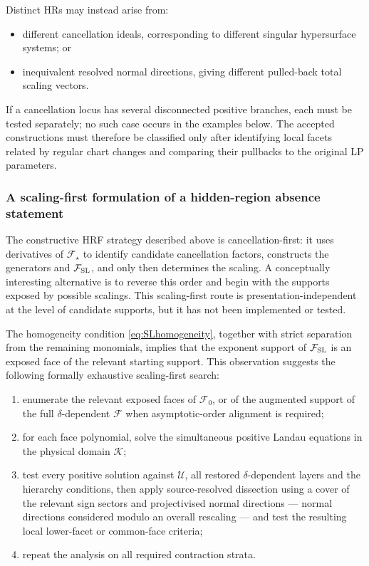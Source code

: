 \documentclass[a4paper,11pt]{article}
\newcommand{\K}{\mathcal K}
\newcommand{\FSL}{\mathcal F_{\rm SL}}
\begin{document}
Distinct HRs may instead arise from:
\begin{itemize}
\item different cancellation ideals, corresponding to different singular
      hypersurface systems; or
\item inequivalent resolved normal directions, giving different pulled-back
      total scaling vectors.
\end{itemize}
If a cancellation locus has several disconnected positive branches, each
must be tested separately; no such case occurs in the examples below.
The accepted constructions must therefore be classified only after identifying
local facets related by regular chart changes and comparing their pullbacks to
the original LP parameters.

\subsubsection{A scaling-first formulation of a hidden-region absence statement}
\label{sec:absence}

The constructive HRF strategy described above is cancellation-first: it uses
derivatives of \(\mathcal F_\star\) to identify candidate cancellation
factors, constructs the generators and \(\FSL\), and only then determines the
scaling.  A conceptually interesting alternative is to reverse this order and
begin with the supports exposed by possible scalings.  This scaling-first
route is presentation-independent at the level of candidate supports, but it
has not been implemented or tested.

The homogeneity condition \eqref{eq:SLhomogeneity}, together with strict
separation from the remaining monomials, implies that the exponent support
of \(\FSL\) is an exposed face of the relevant starting support.  This
observation suggests the following formally exhaustive scaling-first search:

\begin{enumerate}[label=\arabic*.]
\item enumerate the relevant exposed faces of \(\mathcal F_0\), or of the
      augmented support of the full \(\delta\)-dependent \(\mathcal F\) when
      asymptotic-order alignment is required;
\item for each face polynomial, solve the simultaneous positive Landau
      equations in the physical domain \(\K\);
\item test every positive solution against \(\mathcal U\), all restored
      \(\delta\)-dependent layers and the hierarchy conditions, then apply
      source-resolved dissection using a cover of the relevant sign sectors
      and projectivised normal directions --- normal directions considered
      modulo an overall rescaling --- and test the resulting local
      lower-facet or common-face criteria;
\item repeat the analysis on all required contraction strata.
\end{enumerate}
\end{document}
